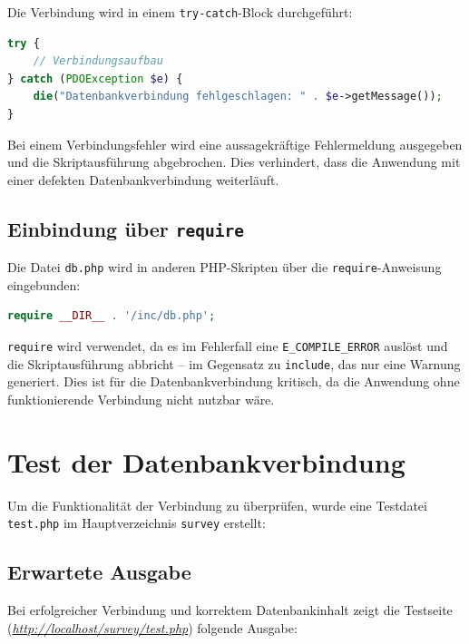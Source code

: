 Die Verbindung wird in einem \texttt{try-catch}-Block durchgeführt:

\begin{lstlisting}[language=php]
try {
    // Verbindungsaufbau
} catch (PDOException $e) {
    die("Datenbankverbindung fehlgeschlagen: " . $e->getMessage());
}
\end{lstlisting}

Bei einem Verbindungsfehler wird eine aussagekräftige Fehlermeldung ausgegeben und die Skriptausführung abgebrochen. Dies verhindert, dass die Anwendung mit einer defekten Datenbankverbindung weiterläuft.

\subsection{Einbindung über \texttt{require}}

Die Datei \texttt{db.php} wird in anderen \acs{PHP}-Skripten über die \texttt{require}-Anweisung eingebunden:

\begin{lstlisting}[language=php]
require __DIR__ . '/inc/db.php';
\end{lstlisting}

\texttt{require} wird verwendet, da es im Fehlerfall eine \texttt{E\_COMPILE\_ERROR} auslöst und die Skriptausführung abbricht – im Gegensatz zu \texttt{include}, das nur eine Warnung generiert. Dies ist für die Datenbankverbindung kritisch, da die Anwendung ohne funktionierende Verbindung nicht nutzbar wäre.

\section{Test der Datenbankverbindung}

Um die Funktionalität der Verbindung zu überprüfen, wurde eine Testdatei \texttt{test.php} im Hauptverzeichnis \texttt{survey} erstellt:



\subsection{Erwartete Ausgabe}

Bei erfolgreicher Verbindung und korrektem Datenbankinhalt zeigt die Testseite (\textit{\textsl{\url{http://localhost/survey/test.php}}}) folgende Ausgabe:

